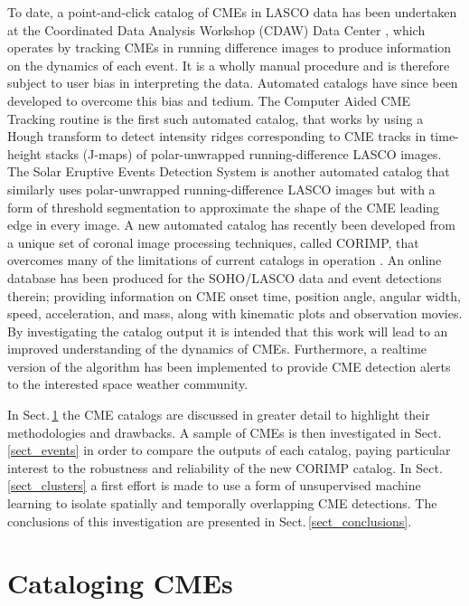 \documentclass[referee,a4paper,12pt,traditabstract]{swsc}
\begin{document}
\begin{linenumbers}
To date, a point-and-click catalog of CMEs in LASCO data has been undertaken at the Coordinated Data Analysis Workshop (CDAW) Data Center \citep{2009EM&P..104..295G}, which operates by tracking CMEs in running difference images to produce information on the dynamics of each event. It is a wholly manual procedure and is therefore subject to user bias in interpreting the data. Automated catalogs have since been developed to overcome this bias and tedium. The Computer Aided CME Tracking routine \cite[CACTus;][]{2004A&A...425.1097R} is the first such automated catalog, that works by using a Hough transform to detect intensity ridges corresponding to CME tracks in time-height stacks (J-maps) of polar-unwrapped running-difference LASCO images. The Solar Eruptive Events Detection System \cite[SEEDS;][]{2008SoPh..248..485O} is another automated catalog that similarly uses polar-unwrapped running-difference LASCO images but with a form of threshold segmentation to approximate the shape of the CME leading edge in every image. A new automated catalog has recently been developed from a unique set of coronal image processing techniques, called CORIMP, that overcomes many of the limitations of current catalogs in operation \citep{2012ApJ...752..144M,2012ApJ...752..145B}. An online database has been produced for the SOHO/LASCO data and event detections therein; providing information on CME onset time, position angle, angular width, speed, acceleration, and mass, along with kinematic plots and observation movies. By investigating the catalog output it is intended that this work will lead to an improved understanding of the dynamics of CMEs. Furthermore, a realtime version of the algorithm has been implemented to provide CME detection alerts to the interested space weather community.

In Sect.\,\ref{sect_catalogs} the CME catalogs are discussed in greater detail to highlight their methodologies and drawbacks. A sample of CMEs is then investigated in Sect.\,\ref{sect_events} in order to compare the outputs of each catalog, paying particular interest to the robustness and reliability of the new CORIMP catalog. In Sect.\,\ref{sect_clusters} a first effort is made to use a form of unsupervised machine learning to isolate spatially and temporally overlapping CME detections. The conclusions of this investigation are presented in Sect.\,\ref{sect_conclusions}.

\section{Cataloging CMEs}
\label{sect_catalogs}


\end{linenumbers}
\end{document}
